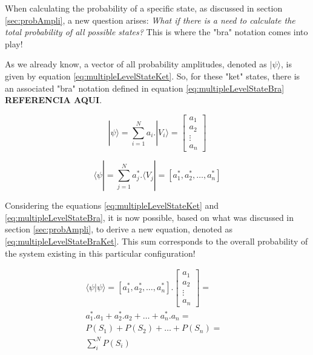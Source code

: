 			\par When calculating the probability of a specific state, as discussed in section \ref{sec:probAmpli}, a new question arises: \textit{What if there is a need to calculate the total probability of all possible states?} This is where the "bra" notation comes into play!\newline
			
			\par As we already know, a vector of all probability amplitudes, denoted as $|\psi\rangle$, is given by equation \ref{eq:multipleLevelStateKet}. So, for these "ket" states, there is an associated "bra" notation defined in equation \ref{eq:multipleLevelStateBra} \textbf{REFERENCIA AQUI}.
			
			\begin{equation}
				|\psi\rangle = \sum_{i=1}^{N} a_i . |V_i\rangle = 
				\begin{bmatrix}
					a_{1} \\
					a_{2} \\
					\vdots \\
					a_{n}
				\end{bmatrix}
				\label{eq:multipleLevelStateKet}
			\end{equation}
			
			\begin{equation}
				\langle\psi| = \sum_{j=1}^{N} a_j^* . \langle V_j| = [a_1^*, a_2^*, \dots, a_n^*]
				\label{eq:multipleLevelStateBra}
			\end{equation}				
			
			\par Considering the equations \ref{eq:multipleLevelStateKet} and \ref{eq:multipleLevelStateBra}, it is now possible, based on what was discussed in section \ref{sec:probAmpli}, to derive a new equation, denoted as \ref{eq:multipleLevelStateBraKet}. This sum corresponds to the overall probability of the system existing in this particular configuration!
			
			
			\begin{equation}
				\begin{aligned}
					\langle\psi|\psi\rangle = [a_1^*, a_2^*, \dots, a_n^*] . \begin{bmatrix}
						a_{1} \\
						a_{2} \\
						\vdots \\
						a_{n}
					\end{bmatrix} = &\\ 
					a_1^*.a_1 + a_2^*.a_2 + \dots + a_n^*.a_n = &\\
					P(S_1) + P(S_2) + \dots + P(S_n) = &\\
					\sum_{i}^{N} P(S_i)
				\end{aligned}
				\label{eq:multipleLevelStateBraKet}
			\end{equation}
		
